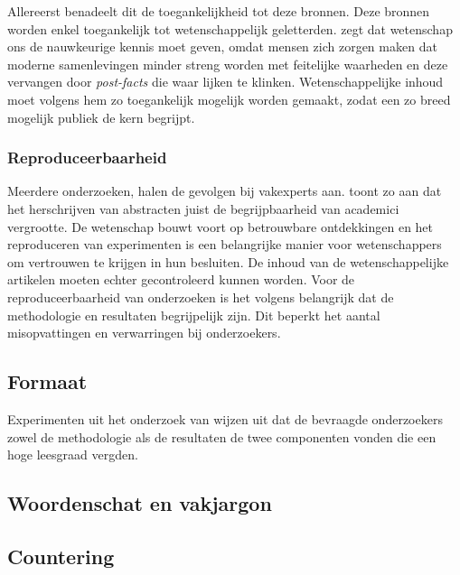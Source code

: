 Allereerst benadeelt dit de toegankelijkheid tot deze bronnen. Deze bronnen worden enkel toegankelijk tot wetenschappelijk geletterden. \textcite{Ennals2010} zegt dat wetenschap ons de nauwkeurige kennis moet geven, omdat mensen zich zorgen maken dat moderne samenlevingen minder streng worden met feitelijke waarheden en deze vervangen door \textit{post-facts} die waar lijken te klinken. Wetenschappelijke inhoud moet volgens hem zo toegankelijk mogelijk worden gemaakt, zodat een zo breed mogelijk publiek de kern begrijpt.

\subsubsection{Reproduceerbaarheid}

Meerdere onderzoeken, halen de gevolgen bij vakexperts aan. \textcite{Hartley1999} toont zo aan dat het herschrijven van abstracten juist de begrijpbaarheid van academici vergrootte. De wetenschap bouwt voort op betrouwbare ontdekkingen en het reproduceren van experimenten is een belangrijke manier voor wetenschappers om vertrouwen te krijgen in hun besluiten. De inhoud van de wetenschappelijke artikelen moeten echter gecontroleerd kunnen worden. Voor de reproduceerbaarheid van onderzoeken is het volgens \textcite{McNutt2014} belangrijk dat de methodologie en resultaten begrijpelijk zijn. Dit beperkt het aantal misopvattingen en verwarringen bij onderzoekers.


\subsection{Formaat}

Experimenten uit het onderzoek van \textcite{Hubbard2017} wijzen uit dat de bevraagde onderzoekers zowel de methodologie als de resultaten de twee componenten vonden die een hoge leesgraad vergden. 

\subsection{Woordenschat en vakjargon}





\subsection{Countering}


